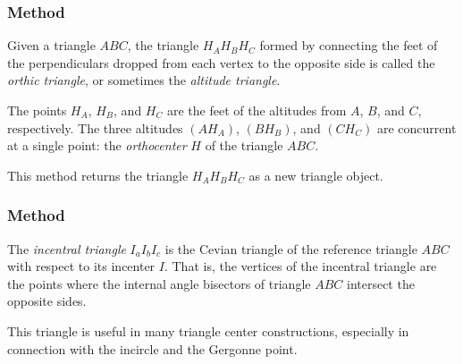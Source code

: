 
\subsubsection{Method } %
\label{ssub:method_triangle_orthic}

Given a triangle $ABC$, the triangle $H_AH_BH_C$ formed by connecting the feet of the perpendiculars dropped from each vertex to the opposite side is called the \emph{orthic triangle}, or sometimes the \emph{altitude triangle}.

The points $H_A$, $H_B$, and $H_C$ are the feet of the altitudes from $A$, $B$, and $C$, respectively. The three altitudes $(AH_A)$, $(BH_B)$, and $(CH_C)$ are concurrent at a single point: the \emph{orthocenter} $H$ of the triangle $ABC$.

This method returns the triangle $H_AH_BH_C$ as a new triangle object.

\vspace{1em}

\begin{tkzexample}[latex=8cm]
\end{tkzexample}




\subsubsection{Method } %
\label{ssub:method_incentral}

The \emph{incentral triangle} $I_aI_bI_c$ is the Cevian triangle of the reference triangle $ABC$ with respect to its incenter $I$. That is, the vertices of the incentral triangle are the points where the internal angle bisectors of triangle $ABC$ intersect the opposite sides.

This triangle is useful in many triangle center constructions, especially in connection with the incircle and the Gergonne point.

